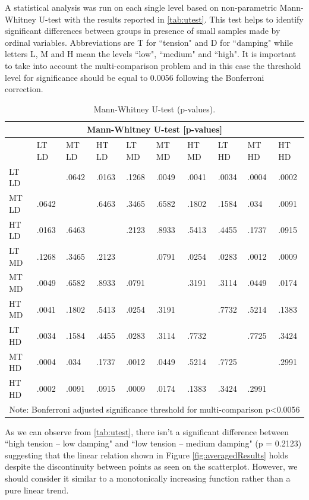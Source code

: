 \documentclass{article}
\begin{document}
A statistical analysis was run on each single level based on non-parametric Mann-Whitney U-test with the results reported in \autoref{tab:utest}. This test helps to identify significant differences between groups in presence of small samples made by ordinal variables. Abbreviations are T for ``tension" and D for ``damping" while letters L, M and H mean the levels ``low", ``medium" and ``high". It is important to take into account the multi-comparison problem and in this case the threshold level for significance should be equal to 0.0056 following the Bonferroni correction.

\def \columnW {0.33cm}
\begin{table}[t]
\tiny
\begin{tabular}{ |p{0.7cm}||p{\columnW}|p{\columnW}|p{\columnW}|p{\columnW}|p{\columnW}|p{\columnW}|p{\columnW}|p{\columnW}|p{\columnW}|  }
 \hline
 \multicolumn{10}{|c|}{Mann-Whitney U-test [p-values]} \\
 \hline
  & LT LD & MT LD & HT LD & LT MD & MT MD & HT MD & LT HD & MT HD & HT HD \\
 \hline
LT LD &	 &.0642 &.0163 &.1268 &.0049 &.0041 &.0034 &.0004 &.0002\\
\hline
MT LD &.0642 &	 &.6463 &.3465 &.6582 &.1802 &.1584 &.034 &.0091\\
\hline
HT LD &.0163 &.6463 &	 &.2123 &.8933 &.5413 &.4455 &.1737 &.0915\\
\hline
LT MD &.1268 &.3465 &.2123 &	 &.0791 &.0254 &.0283 &.0012 &.0009\\
\hline
MT MD &.0049 &.6582 &.8933 &.0791 &	 &.3191 &.3114 &.0449 &.0174\\
\hline
HT MD &.0041 &.1802 &.5413 &.0254 &.3191 &	 &.7732 &.5214 &.1383\\
\hline
LT HD &.0034 &.1584 &.4455 &.0283 &.3114 &.7732 &	 &.7725 &.3424\\
\hline
MT HD &.0004 &.034 &.1737 &.0012 &.0449 &.5214 &.7725 &	 &.2991\\
\hline
HT HD &.0002 &.0091 &.0915 &.0009 &.0174 &.1383 &.3424 &.2991 &	\\

 \hline
 \multicolumn{10}{|c|}{Note: Bonferroni adjusted significance threshold for multi-comparison p\textless0.0056} \\
 \hline
\end{tabular}
\caption{Mann-Whitney U-test (p-values).}
\label{tab:utest}
\end{table}

As we can observe from \autoref{tab:utest}, there isn't a significant difference between ``high tension -- low damping" and ``low tension -- medium damping" (p = 0.2123) suggesting that the linear relation shown in Figure \ref{fig:averagedResults} holds despite the discontinuity between points as seen on the scatterplot. However, we should consider it similar to a monotonically increasing function rather than a pure linear trend. 
\end{document}
